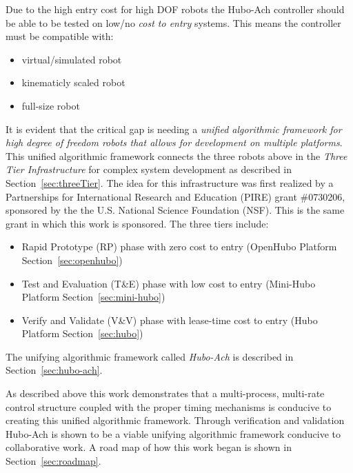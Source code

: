 

Due to the high entry cost for high DOF robots the Hubo-Ach controller should be able to be tested on low/no \textit{cost to entry} systems.
This means the controller must be compatible with:

\begin{multicols}{2}
\begin{itemize}
\item virtual/simulated robot
\item kinematicly scaled robot
\item full-size robot
\end{itemize}
\end{multicols}





It is evident that the critical gap is needing a \textit{unified algorithmic framework for high degree of freedom robots that allows for development on multiple platforms}.
This unified algorithmic framework connects the three robots above in the \textit{Three Tier Infrastructure}\cite{threeTier} for complex system development as described in Section~\ref{sec:threeTier}.
The idea for this infrastructure was first realized by a Partnerships for International Research and Education (PIRE) grant \#0730206, sponsored by the the U.S. National Science Foundation (NSF).
This is the same grant in which this work is sponsored.
The three tiers include:
\begin{itemize}
\item Rapid Prototype (RP) phase with zero cost to entry (OpenHubo Platform Section~\ref{sec:openhubo})
\item Test and Evaluation (T\&E) phase with low cost to entry (Mini-Hubo Platform Section~\ref{sec:mini-hubo})
\item Verify and Validate (V\&V) phase with lease-time cost to entry (Hubo Platform Section~\ref{sec:hubo})
\end{itemize}
The unifying algorithmic framework called \textit{Hubo-Ach}\cite{lofaroRAM2013} is described in Section~\ref{sec:hubo-ach}.


As described above this work demonstrates that a multi-process, multi-rate control structure coupled with the proper timing mechanisms is conducive to creating this unified algorithmic framework.
Through verification and validation Hubo-Ach is shown to be a viable unifying algorithmic framework conducive to collaborative work.  
A road map of how this work began is shown in Section~\ref{sec:roadmap}.

